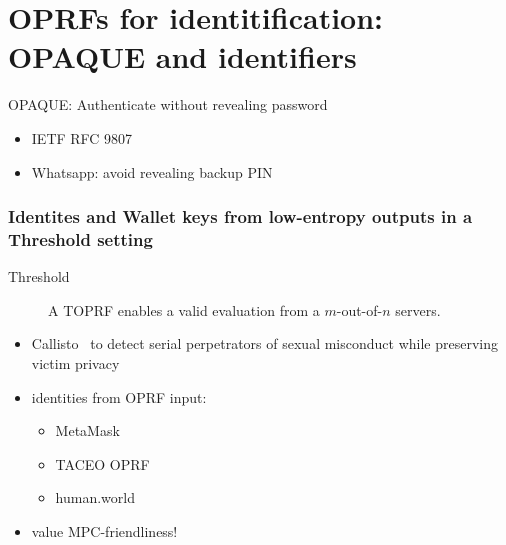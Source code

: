 \documentclass[10pt]{beamer}
\begin{document}
\section{OPRFs for identitification: OPAQUE and identifiers}
\begin{frame}{OPAQUE: Authenticate without revealing password}
  \vspace{-3em}
  \pause
  \begin{itemize}
    \item IETF RFC 9807~\cite{rfc9807}\pause
    \item Whatsapp: avoid revealing backup PIN~\cite{whatsapp-whitepaper}
  \end{itemize}
\end{frame}


\begin{frame}
  \frametitle{Identites and Wallet keys from low-entropy outputs in a Threshold
  setting}
  \begin{description}
    \item[Threshold] A TOPRF enables a valid evaluation from a $m$-out-of-$n$ servers.\pause
  \end{description}
  \begin{itemize}
    \item Callisto~\cite{COMPASS:RQABLV18} to detect serial perpetrators of
      sexual misconduct while preserving victim privacy\pause
    \item identities from OPRF input: 
      \begin{itemize}
        \item MetaMask~\cite{metamask}
        \item TACEO OPRF~\cite{taceo-oprf}
        \item human.world~\cite{human}
      \end{itemize}\pause
    \item value
      \alert{MPC-friendliness!}
  \end{itemize}
\end{frame}
\end{document}

